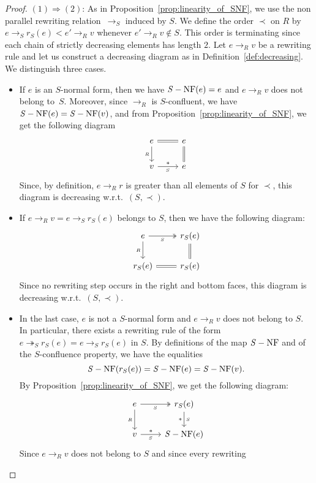 \documentclass[11pt]{article}
\theoremstyle{definition}
\newcommand\rewR{\to_R}
\newcommand\parS{\twoheadrightarrow_S}
\DeclareMathOperator{\SNF}{{\it S}-NF}
\begin{document}
\begin{proof}
  $(1)\Rightarrow (2)$: As in Proposition~\ref{prop:linearity_of_SNF}, we
  use the non parallel rewriting relation~$\to_S$ induced by $S$. We
  define the order $\prec$ on $R$ by $e\to_S r_S(e)<e'\rewR v$ whenever
  $e'\rewR v\notin S$. This order is terminating since each chain of
  strictly decreasing elements has length $2$. Let $e\rewR v$ be a
  rewriting rule and let us construct a decreasing diagram as in
  Definition~\ref{def:decreasing}. We distinguish three cases.
  \begin{itemize}
  \item If $e$ is an $S$-normal form, then we have $\SNF(e)=e$ and
    $e\rewR v$ does not belong to~$S$. Moreover, since $\rewR$ is
    $S$-confluent, we have $\SNF(e)=\SNF(v)$, and from
    Proposition~\ref{prop:linearity_of_SNF}, we get the following diagram
    \[\begin{tikzcd}
    e\ar[d, "_R"']\ar[r, equal] &
    e\ar[d, equal]\\
    v\ar[r, "*", "_S"'] & e
    \end{tikzcd}\]
    Since, by definition, $e\rewR r$ is greater than all elements of $S$ 
    for $\prec$, this diagram is decreasing w.r.t.\ $(S,\prec)$. 
  \item If $e\rewR v=e\to_S r_S(e)$ belongs to $S$, then we have the 
    following diagram:
    \[\begin{tikzcd}
    e\ar[r, twoheadrightarrow, "_S"']\ar[d, "_R"']
    & r_S(e) \ar[equal, d]\\
    r_S(e)\ar[r, equal] & r_S(e)
    \end{tikzcd}\]
    Since no rewriting step occurs in the right and bottom faces, this
    diagram is decreasing w.r.t.\ $(S,\prec)$.
  \item In the last case, $e$ is not a $S$-normal form and $e\rewR v$
    does not belong to $S$. In particular, there exists a rewriting rule
    of the form $e\parS r_S(e)=e\to_S r_S(e)$ in $S$. By definitions of
    the map $\SNF$ and of the $S$-confluence property, we have the
    equalities
    \[\SNF(r_S(e))=\SNF(e)=\SNF(v).
    \smallskip\]
    By Proposition~\ref{prop:linearity_of_SNF}, we get the following
    diagram:
    \[\begin{tikzcd}
    e\ar[d, "_R"']\ar[r, twoheadrightarrow, "_S"'] &
    r_S(e) \ar["_S", "*"', d] \\
    v \ar[r, "_S"', "*"] & \SNF (e)
    \end{tikzcd}\]
    Since $e\rewR v$ does not belong to $S$ and since every rewriting

\end{itemize}
\end{proof}
\end{document}
